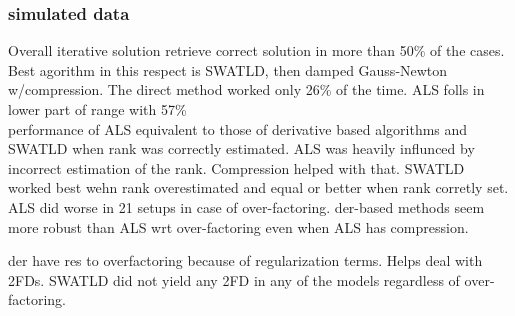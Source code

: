 \documentclass[10pt, draft]{article}
\begin{document}
  \subsubsection{simulated data}
  Overall iterative solution retrieve correct solution in more than 50\% of the cases.  Best agorithm in this respect is SWATLD, then damped Gauss-Newton w/compression.  The direct method worked only 26\% of the time.  ALS folls in lower part of range with 57\%\\
  performance of ALS equivalent to those of derivative based algorithms and SWATLD when rank was correctly estimated.  ALS was heavily influnced by incorrect estimation of the rank. Compression helped with that.  SWATLD worked best wehn rank overestimated and equal or better when rank corretly set.  ALS did worse in 21 setups in case of over-factoring.  der-based methods seem more robust than ALS wrt over-factoring even when ALS has compression. \linebreak[1]
  
  der have res to overfactoring because of regularization terms.  Helps deal with 2FDs.  SWATLD did not yield any 2FD in any of the models regardless of over-factoring.  
 
\end{document}
